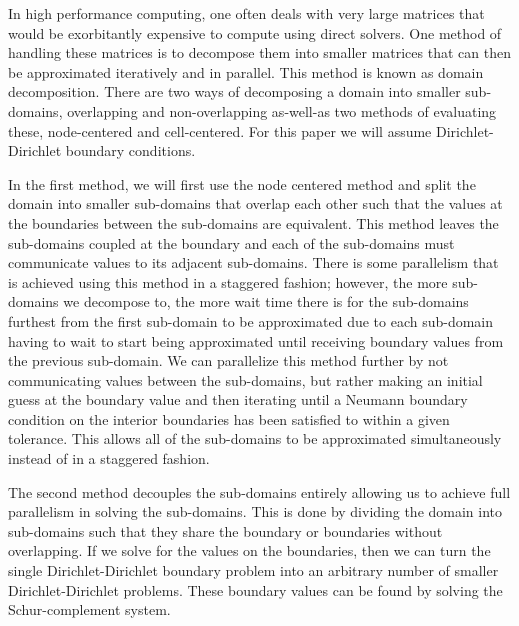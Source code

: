 In high performance computing, one often deals with very large matrices that would be exorbitantly expensive to compute using direct solvers. One method of handling these matrices is to decompose them into smaller matrices that can then be approximated iteratively and in parallel. This method is known as domain decomposition. There are two ways of decomposing a domain into smaller sub-domains, overlapping and non-overlapping as-well-as two methods of evaluating these, node-centered and cell-centered. For this paper we will assume Dirichlet-Dirichlet boundary conditions.

In the first method, we will first use the node centered method and split the domain into smaller sub-domains that overlap each other such that the values at the boundaries between the sub-domains are equivalent. This method leaves the sub-domains coupled at the boundary and each of the sub-domains must communicate values to its adjacent sub-domains. There is some parallelism that is achieved using this method in a staggered fashion; however, the more sub-domains we decompose to, the more wait time there is for the sub-domains furthest from the first sub-domain to be approximated due to each sub-domain having to wait to start being approximated until receiving boundary values from the previous sub-domain. We can parallelize this method further by not communicating values between the sub-domains, but rather making an initial guess at the boundary value and then iterating until a Neumann boundary condition on the interior boundaries has been satisfied to within a given tolerance. This allows all of the sub-domains to be approximated simultaneously instead of in a staggered fashion.

The second method decouples the sub-domains entirely allowing us to achieve full parallelism in solving the sub-domains. This is done by dividing the domain into sub-domains such that they share the boundary or boundaries without overlapping. If we solve for the values on the boundaries, then we can turn the single Dirichlet-Dirichlet boundary problem into an arbitrary number of smaller Dirichlet-Dirichlet problems. These boundary values can be found by solving the Schur-complement system.